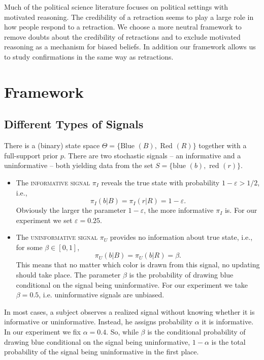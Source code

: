 \documentclass{article}
\begin{document}
Much of the political science literature focuses on political settings with motivated reasoning. The credibility of a retraction seems to play a large role in how people respond to a retraction. We choose a more neutral framework to remove doubts about the credibility of retractions and to exclude motivated reasoning as a mechanism for biased beliefs. In addition our framework allows us to study confirmations in the same way as retractions.


\section{Framework}

\subsection{Different Types of Signals}

There is a (binary) state space $\Theta=\{\text{Blue }(B), \text{ Red }(R)\}$ together with a full-support prior $p$. There are two stochastic signals -- an informative and a uninformative -- both yielding data from the set $S=\{\text{blue }(b), \text{ red }(r)\}$. 

\begin{itemize}

    \item The \textsc{informative signal} $\pi_I$ reveals the true state with probability $1-\varepsilon>1/2$, i.e., 
    $$\pi_I(b|B)=\pi_I(r|R)=1-\varepsilon.$$ 
    Obviously the larger the parameter $1-\varepsilon$, the more informative $\pi_I$ is. For our experiment we set $\varepsilon=0.25$.
    
    \item The \textsc{uninformative signal} $\pi_U$ provides no information about true state, i.e., for some $\beta\in[0,1]$,
    $$\pi_U(b|B)=\pi_U(b|R)=\beta.$$ 
    This means that no matter which color is drawn from this signal, no updating should take place. The parameter $\beta$ is the probability of drawing blue conditional on the signal being uninformative. For our experiment we take $\beta=0.5$, i.e. uninformative signals are unbiased.

\end{itemize}

In most cases, a subject observes a realized signal without knowing whether it is informative or uninformative. Instead, he assigns probability $\alpha$ it is informative. In our experiment we fix $\alpha=0.4$. So, while $\beta$ is the conditional probability of drawing blue conditional on the signal being uninformative, $1-\alpha$ is the total probability of the signal being uninformative in the first place. 
\end{document}

